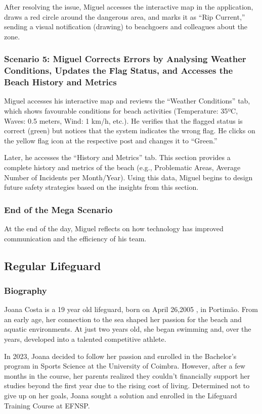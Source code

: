After resolving the issue, Miguel accesses the interactive map in the application, draws a red circle around the dangerous area, and marks it as ``Rip Current,'' sending a visual notification (drawing) to beachgoers and colleagues about the zone.

\subsubsection{\textbf{Scenario 5:} Miguel Corrects Errors by Analysing Weather Conditions, Updates the Flag Status, and Accesses the Beach History and Metrics}
Miguel accesses his interactive map and reviews the ``Weather Conditions'' tab, which shows favourable conditions for beach activities (Temperature: 35ºC, Waves: 0.5 meters, Wind: 1 km/h, etc.). He verifies that the flagged status is correct (green) but notices that the system indicates the wrong flag. He clicks on the yellow flag icon at the respective post and changes it to ``Green.'' 

Later, he accesses the ``History and Metrics'' tab. This section provides a complete history and metrics of the beach (e.g., Problematic Areas, Average Number of Incidents per Month/Year). Using this data, Miguel begins to design future safety strategies based on the insights from this section.

\subsubsection{\textbf{End of the Mega Scenario}}
At the end of the day, Miguel reflects on how technology has improved communication and the efficiency of his team.


\subsection{Regular Lifeguard}
\subsubsection{\textbf{Biography}}
Joana Costa is a 19 year old lifeguard, born on April 26,2005 , in Portimão. From an early age, her connection to the sea shaped her passion for the beach and aquatic environments. At just two years old, she began swimming and, over the years, developed into a talented competitive athlete.

In 2023, Joana decided to follow her passion and enrolled in the Bachelor’s program in Sports Science at the University of Coimbra. However, after a few months in the course, her parents realized they couldn’t financially support her studies beyond the first year due to the rising cost of living. Determined not to give up on her goals, Joana sought a solution and enrolled in the Lifeguard Training Course at EFNSP.

